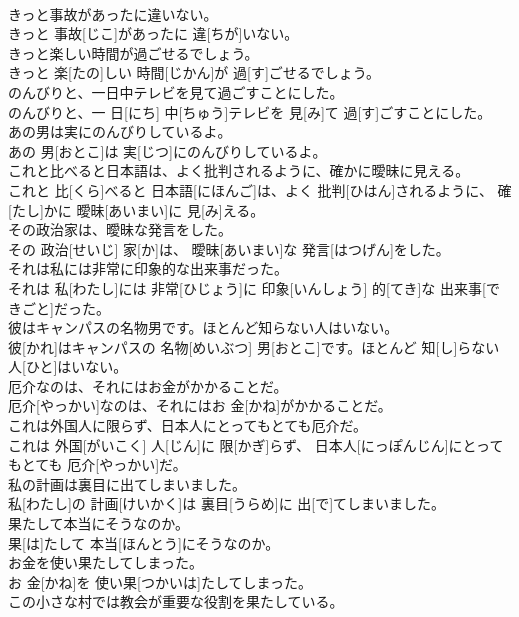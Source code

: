 \documentclass[8pt]{extreport}
\begin{document}
\begin{CJK}{UTF8}{min}
\\	きっと事故があったに違いない。	
\\	きっと 事故[じこ]があったに 違[ちが]いない。	
\\	きっと楽しい時間が過ごせるでしょう。	
\\	きっと 楽[たの]しい 時間[じかん]が 過[す]ごせるでしょう。	
\\	のんびりと、一日中テレビを見て過ごすことにした。	
\\	のんびりと、一 日[にち] 中[ちゅう]テレビを 見[み]て 過[す]ごすことにした。	
\\	あの男は実にのんびりしているよ。	
\\	あの 男[おとこ]は 実[じつ]にのんびりしているよ。	
\\	これと比べると日本語は、よく批判されるように、確かに曖昧に見える。	
\\	これと 比[くら]べると 日本語[にほんご]は、よく 批判[ひはん]されるように、 確[たし]かに 曖昧[あいまい]に 見[み]える。	
\\	その政治家は、曖昧な発言をした。	
\\	その 政治[せいじ] 家[か]は、 曖昧[あいまい]な 発言[はつげん]をした。	
\\	それは私には非常に印象的な出来事だった。	
\\	それは 私[わたし]には 非常[ひじょう]に 印象[いんしょう] 的[てき]な 出来事[できごと]だった。	
\\	彼はキャンパスの名物男です。ほとんど知らない人はいない。	
\\	彼[かれ]はキャンパスの 名物[めいぶつ] 男[おとこ]です。ほとんど 知[し]らない 人[ひと]はいない。	
\\	厄介なのは、それにはお金がかかることだ。	
\\	厄介[やっかい]なのは、それにはお 金[かね]がかかることだ。	
\\	これは外国人に限らず、日本人にとってもとても厄介だ。	
\\	これは 外国[がいこく] 人[じん]に 限[かぎ]らず、 日本人[にっぽんじん]にとってもとても 厄介[やっかい]だ。	
\\	私の計画は裏目に出てしまいました。	
\\	私[わたし]の 計画[けいかく]は 裏目[うらめ]に 出[で]てしまいました。	
\\	果たして本当にそうなのか。	
\\	果[は]たして 本当[ほんとう]にそうなのか。	
\\	お金を使い果たしてしまった。	
\\	お 金[かね]を 使い果[つかいは]たしてしまった。	
\\	この小さな村では教会が重要な役割を果たしている。	

\end{CJK}
\end{document}
